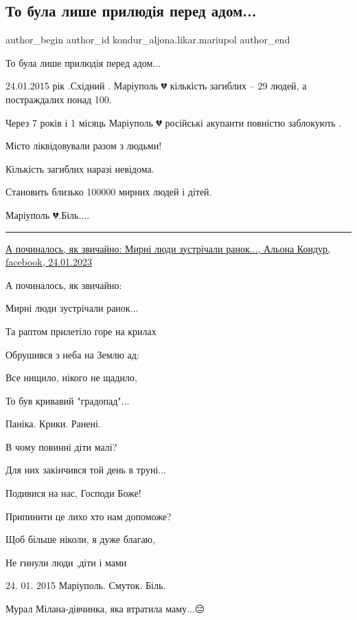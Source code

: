  
 
 
 
 

\subsection{То була лише прилюдія перед  адом...}
\label{sec:24_01_2023.fb.kondur_aljona.likar.mariupol.1.to_bula_lishe_prilyu}

\ifcmt
 author_begin
   author_id kondur_aljona.likar.mariupol
 author_end
\fi

То була лише прилюдія перед  адом...

24.01.2015 рік  .Східний . Маріуполь 💔 кількість загиблих  – 29 людей, а
постраждалих понад 100.

Через 7 років і 1 місяць  Маріуполь 💔 російські акупанти повністю заблокують .

Місто ліквідовували разом з людьми!

Кількість загиблих наразі невідома.

Становить близько 100000 мирних людей і дітей.

Маріуполь 💔.Біль....

\par\noindent\rule{\textwidth}{0.4pt}

\href{https://www.facebook.com/permalink.php?story_fbid=pfbid0giL7y8nU7RtQr3AYpiCmHH4zZgyP2DQ8x5mM76Fhf82X5tyaud1JgGD89dgDucXrl&id=100027898262541}{А починалось, як звичайно: Мирні люди зустрічали ранок..., Альона Кондур, facebook, 24.01.2023}

А починалось, як звичайно:

Мирні люди зустрічали ранок...

Та раптом прилетіло горе на крилах

Обрушився з неба на Землю ад:

Все нищило, нікого не щадило,

То був кривавий "градопад"...

Паніка. Крики. Ранені.

В чому повинні діти малі?

Для них закінчився той день в труні...

Подивися на нас, Господи Боже!

Припинити це лихо хто нам допоможе?

Щоб більше ніколи, я дуже благаю,

Не гинули люди ,діти і  мами🙏

24. 01. 2015 Маріуполь. Смуток. Біль.

Мурал Мілана-дівчинка, яка  втратила  маму...😔
